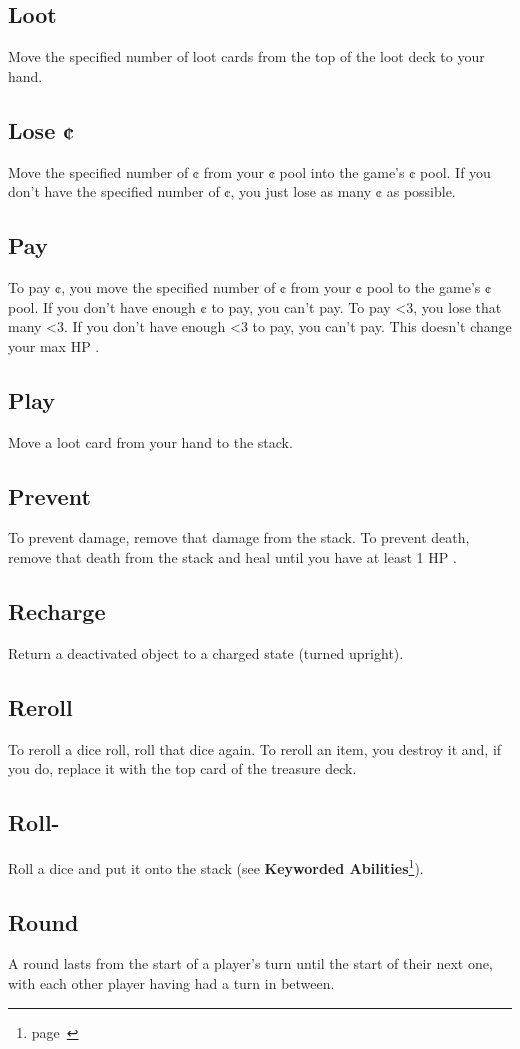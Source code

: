 \documentclass[
  fontsize=10pt,
  paper=a5,
  version=last,
  chapterprefix=true,
  bindingoffset=5mm,
  ]{scrbook}
\newcommand*{\inlineicon}[1]{%
    \raisebox{-.3\baselineskip}{%
        \smash{%
            \texttt{[image: \#1]}%
        }%
    }%
}
\newcommand{\heart}{\inlineicon{./assets/ms-heart.png}}
\begin{document}
    \subsection*{Loot}
    Move the specified number of loot cards from the top of the loot deck to your hand.
    \subsection*{Lose ¢}
    Move the specified number of ¢ from your ¢ pool into the game’s ¢ pool. If you don’t have the specified number of ¢, you just lose as many ¢ as possible.
    \subsection*{Pay}
    To pay ¢, you move the specified number of ¢ from your ¢ pool to the game’s ¢ pool. If you don’t have enough ¢ to pay, you can’t pay. To pay <3, you lose that many <3. If you don’t have enough <3 to pay, you can’t pay. This doesn’t change your max HP\heart.
    \subsection*{Play}
    Move a loot card from your hand to the stack.
    \subsection*{Prevent}
    To prevent damage, remove that damage from the stack. To prevent death, remove that death from the stack and heal until you have at least 1 HP\heart.
    \subsection*{Recharge}
    Return a deactivated object to a charged state (turned upright).
    \subsection*{Reroll}
    To reroll a dice roll, roll that dice again. To reroll an item, you destroy it and, if you do, replace it with the top card of the treasure deck.
    \subsection*{Roll-}
    Roll a dice and put it onto the stack (see \textbf{Keyworded Abilities}\footnote{page~\pageref{keyworded}}).
    \subsection*{Round}
    A round lasts from the start of a player’s turn until the start of their next one, with each other player having had a turn in between.
\end{document}
